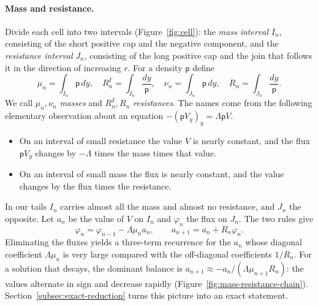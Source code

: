 \paragraph{Mass and resistance.}
Divide each cell into two intervals (Figure~\ref{fig:cell}): the
\emph{mass interval} $I_n$, consisting of the short positive cap and
the negative component, and the \emph{resistance interval} $J_n$,
consisting of the long positive cap and the join that follows it in
the direction of increasing $r$. For a density $\mathsf p$ define
\begin{equation}\label{eq:mass-resistance-def-new}
 \mu_n=\int_{I_n}\mathsf p\,dy,\quad
 R_n^I=\int_{I_n}\frac{dy}{\mathsf p},\quad
 \nu_n=\int_{J_n}\mathsf p\,dy,\quad
 R_n=\int_{J_n}\frac{dy}{\mathsf p}.
\end{equation}
We call $\mu_n,\nu_n$ \emph{masses} and $R_n^I,R_n$
\emph{resistances}. The names come from the following elementary
observation about an equation $-(\mathsf pV_y)_y=\Lambda\mathsf pV$.
\begin{itemize}
\item On an interval of small resistance the value $V$ is nearly
 constant, and the flux $\mathsf pV_y$ changes by $-\Lambda$ times the
 mass times that value.
\item On an interval of small mass the flux is nearly constant, and
 the value changes by the flux times the resistance.
\end{itemize}
In our tails $I_n$ carries almost all the mass and almost no
resistance, and $J_n$ the opposite. Let $a_n$ be the value of $V$ on
$I_n$ and $\varphi_n$ the flux on $J_n$. The two rules give
\[
 \varphi_n=\varphi_{n-1}-\Lambda\mu_na_n,\qquad
 a_{n+1}=a_n+R_n\varphi_n .
\]
Eliminating the fluxes yields a three-term recurrence for the $a_n$
whose diagonal coefficient $\Lambda\mu_n$ is very large compared with
the off-diagonal coefficients $1/R_n$. For a solution that decays, the
dominant balance is $a_{n+1}\approx-a_n/(\Lambda\mu_{n+1}R_n)$: the
values alternate in sign and decrease rapidly
(Figure~\ref{fig:mass-resistance-chain}).
Section~\ref{subsec:exact-reduction} turns this picture into an exact
statement.

